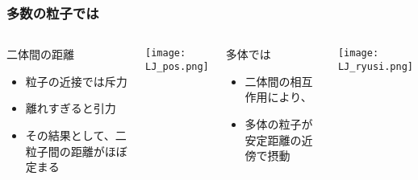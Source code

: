 \documentclass[12pt, dvipdfmx]{beamer}
\begin{document}
\begin{frame}
	\frametitle{多数の粒子では}
		\begin{columns}[T, onlytextwidth]
				\begin{block}{二体間の距離}
					\begin{itemize}
						\item 粒子の近接では斥力
						\item 離れすぎると引力
						\item その結果として、二粒子間の距離がほぼ定まる
					\end{itemize}
				\end{block}
				\begin{center}
					\texttt{[image: LJ\_pos.png]}
				\end{center}
				\begin{exampleblock}{多体では}
					\begin{itemize}
						\item 二体間の相互作用により、
						\item 多体の粒子が安定距離の近傍で摂動
					\end{itemize}
				\end{exampleblock}
				\begin{center}
					\texttt{[image: LJ\_ryusi.png]}
				\end{center}
		\end{columns}
\end{frame}
\end{document}
